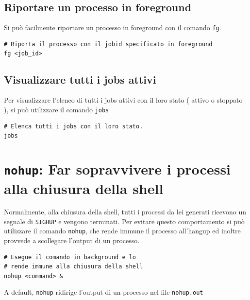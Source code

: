 \documentclass[a4paper]{report}
\newenvironment{info}{\begin{tcolorbox}[fonttitle=\sffamily\bfseries\large,title=Info,colframe=blue!75!white]}{\end{tcolorbox}}
\newenvironment{code}{\begin{tcolorbox}[size=small]}{\end{tcolorbox}}
\begin{document}
\subsection{Riportare un processo in foreground}

Si può facilmente riportare un processo in foreground con il comando \texttt{fg}.

\begin{code} 
\begin{lstlisting}
# Riporta il processo con il jobid specificato in foreground
fg <job_id>
\end{lstlisting}
\end{code}

\subsection{Visualizzare tutti i jobs attivi}

Per visualizzare l'elenco di tutti i jobs attivi con il loro stato ( attivo o stoppato ), si può utilizzare il comando \texttt{jobs}
\begin{code} 
\begin{lstlisting}
# Elenca tutti i jobs con il loro stato.
jobs
\end{lstlisting}
\end{code}

\section{\texttt{nohup}: Far sopravvivere i processi alla chiusura della shell}

Normalmente, alla chiusura della shell, tutti i processi da lei generati ricevono un segnale di \texttt{SIGHUP} e vengono terminati. Per evitare questo comportamento si può utilizzare il comando \texttt{nohup}, che rende immune il processo all'hangup ed inoltre provvede a scollegare l'output di un processo.

\begin{code} 
\begin{lstlisting}
# Esegue il comando in background e lo
# rende immune alla chiusura della shell
nohup <command> &
\end{lstlisting}
\end{code}

\begin{info}
	A default, \texttt{nohup} ridirige l'output di un processo nel file \texttt{nohup.out}
\end{info}
\end{document}
